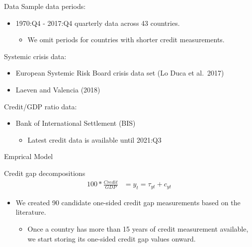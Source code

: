 \documentclass[
  ignorenonframetext,
]{beamer}
\providecommand{\tightlist}{%
  \setlength{\itemsep}{0pt}\setlength{\parskip}{0pt}}
\begin{document}
\begin{frame}{Data}
\protect\hypertarget{data-2}{}
Sample data periods:

\begin{itemize}
\tightlist
\item
  1970:Q4 - 2017:Q4 quarterly data across 43 countries.

  \begin{itemize}
  \tightlist
  \item
    We omit periods for countries with shorter credit measurements.
  \end{itemize}
\end{itemize}

Systemic crisis data:

\begin{itemize}
\tightlist
\item
  European Systemic Risk Board crisis data set (Lo Duca et al.~2017)
\item
  Laeven and Valencia (2018)
\end{itemize}

Credit/GDP ratio data:

\begin{itemize}
\tightlist
\item
  Bank of International Settlement (BIS)

  \begin{itemize}
  \tightlist
  \item
    Latest credit data is available until 2021:Q3
  \end{itemize}
\end{itemize}
\end{frame}

\begin{frame}{Emprical Model}
\protect\hypertarget{emprical-model}{}
\begin{block}{Credit gap decompositions}
\protect\hypertarget{credit-gap-decompositions}{}
\begin{align}
    100*\frac{Credit}{GDP} &= y_t = \tau_{yt} + c_{yt}
\end{align}

\begin{itemize}
\tightlist
\item
  We created 90 candidate one-sided credit gap measurements based on the
  literature.

  \begin{itemize}
  \tightlist
  \item
    Once a country has more than 15 years of credit measurement
    available, we start storing its one-sided credit gap values onward.
  \end{itemize}
\end{itemize}
\end{block}
\end{frame}
\end{document}
